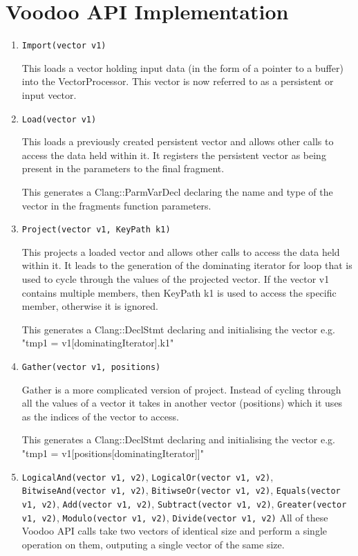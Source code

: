 \chapter{Voodoo API Implementation}
\label{appendix:api}

\begin{enumerate}

\item \texttt{Import(vector v1)}

This loads a vector holding input data (in the form of a pointer to a buffer) into the VectorProcessor. This vector is now referred to as a persistent or input vector.

\item \texttt{Load(vector v1)}

This loads a previously created persistent vector and allows other calls to access the data held within it. It registers the persistent vector as being present in the parameters to the final fragment. 

This generates a Clang::ParmVarDecl declaring the name and type of the vector in the fragments function parameters.

\item \texttt{Project(vector v1, KeyPath k1)}

This projects a loaded vector and allows other calls to access the data held within it. It leads to the generation of the dominating iterator for loop that is used to cycle through the values of the projected vector. If the vector v1 contains multiple members, then KeyPath k1 is used to access the specific member, otherwise it is ignored.

This generates a Clang::DeclStmt declaring and initialising the vector e.g. "tmp1 = v1[dominatingIterator].k1"

\item \texttt{Gather(vector v1, positions)}

Gather is a more complicated version of project. Instead of cycling through all the values of a vector it takes in another vector (positions) which it uses as the indices of the vector to access. 

This generates a Clang::DeclStmt declaring and initialising the vector e.g. "tmp1 = v1[positions[dominatingIterator]]"

\item \texttt{LogicalAnd(vector v1, v2)}, \texttt{LogicalOr(vector v1, v2)}, \texttt{BitwiseAnd(vector v1, v2)}, \texttt{BitiwseOr(vector v1, v2)}, \texttt{Equals(vector v1, v2)}, \texttt{Add(vector v1, v2)}, \texttt{Subtract(vector v1, v2)}, \texttt{Greater(vector v1, v2)}, \texttt{Modulo(vector v1, v2)}, \texttt{Divide(vector v1, v2)} 
All of these Voodoo API calls take two vectors of identical size and perform a single operation on them, outputing a single vector of the same size. 


\end{enumerate}
